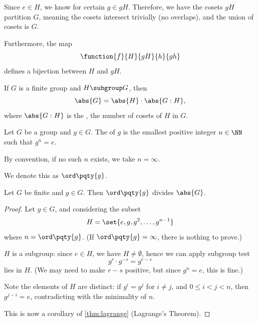 Since \(e \in H\), we know for certain \(g \in gH\). Therefore, we have the cosets \(gH\) partition \(G\), meaning the cosets intersect trivially (no overlaps), and the union of cosets is \(G\).

Furthermore, the map
\[
    \function{f}{H}{gH}{h}{gh}
\]
defines a bijection between \(H\) and \(gH\).

\begin{theorem}[Lagrange]
    \label{thm:lagrange}%
    If \(G\) is a finite group and \(H \subgroup G\), then
    \[
        \abs{G} = \abs{H} \cdot \abs{G : H},
    \]
    where \(\abs{G : H}\) is the , the number of cosets of \(H\) in \(G\).
\end{theorem}

\begin{definition}
    \label{def:order-of-element}%
    Let \(G\) be a group and \(g \in G\). The  of \(g\) is the smallest positive integer \(n \in \NN\) such that \(g^n = e\).

    By convention, if no such \(n\) exists, we take \(n = \infty\).

    We denote this as \(\ord\pqty{g}\).
\end{definition}

\begin{proposition}
    \label{prop:order-of-element-divides-order-of-group}%
    Let \(G\) be finite and \(g \in G\). Then \(\ord\pqty{g}\) divides \(\abs{G}\).
\end{proposition}

\begin{proof}
    Let \(g \in G\), and considering the subset
    \[
        H = \set{e, g, g^2, \ldots, g^{n - 1}}
    \]
    where \(n = \ord\pqty{g}\). (If \(\ord\pqty{g} = \infty\), there is nothing to prove.)

    \(H\) is a subgroup: since \(e \in H\), we have \(H \neq \emptyset\), hence we can apply subgroup test
    \[
        g^r \cdot g^{-s} = g^{r - s}
    \]
    lies in \(H\). (We may need to make \(r - s\) positive, but since \(g^n = e\), this is fine.)

    Note the elements of \(H\) are distinct: if \(g^{i} = g^{j}\) for \(i \neq j\), and \(0 \leq i < j < n\), then \(g^{j - i} = e\), contradicting with the minimality of \(n\).

    This is now a corollary of \autoref{thm:lagrange} (Lagrange's Theorem).
\end{proof}